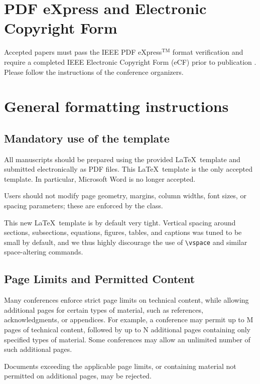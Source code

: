 \documentclass[9pt]{ieeeconf}
\begin{document}
\section{PDF eXpress and Electronic Copyright Form}
\label{sec:PDF_express_Copyright}

Accepted papers must pass the IEEE PDF eXpress$^{\text{TM}}$ format verification
and require a completed IEEE Electronic Copyright Form (eCF) prior to
publication \cite{IEEEXploreReqs}. Please follow the instructions of the
conference organizers.


\section{General formatting instructions}
\label{sec:format}

\subsection{Mandatory use of the template}
\label{sec:template}

All manuscripts should be prepared using the provided \LaTeX\ template and
submitted electronically as PDF files. This \LaTeX\ template is the only
accepted template. In particular, Microsoft Word is no longer accepted.

Users should not modify page geometry, margins, column widths, font sizes, or
spacing parameters; these are enforced by the class.

This new \LaTeX\ template is by default very tight. Vertical spacing around
sections, subsections, equations, figures, tables, and captions was tuned to be
small by default, and we thus highly discourage the use of
\texttt{\textbackslash{vspace}} and similar space-altering commands.

\subsection{Page Limits and Permitted Content}
\label{sec:pagelimit}

Many conferences enforce strict page limits on technical content, while allowing
additional pages for certain types of material, such as references,
acknowledgments, or appendices. For example, a conference may permit up to M
pages of technical content, followed by up to N additional pages containing only
specified types of material. Some conferences may allow an unlimited number of
such additional pages.

Documents exceeding the applicable page limits, or containing material not
permitted on additional pages, may be rejected.
\end{document}
